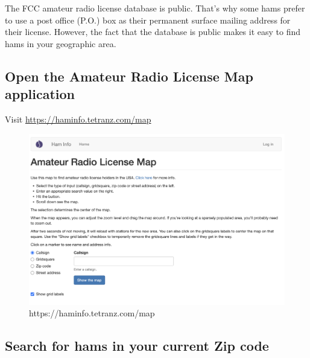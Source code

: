 \documentclass[
  letterpaper,
  DIV=11,
  numbers=noendperiod]{scrreport}
\begin{document}

The FCC amateur radio license database is public. That's why some hams
prefer to use a post office (P.O.) box as their permanent surface
mailing address for their license. However, the fact that the database
is public makes it easy to find hams in your geographic area.

\hypertarget{open-the-amateur-radio-license-map-application}{%
\subsection*{Open the Amateur Radio License Map
application}\label{open-the-amateur-radio-license-map-application}}

Visit \url{https://haminfo.tetranz.com/map}

\begin{figure}

{\centering \includegraphics[width=1\textwidth,height=\textheight]{include/img/ham-radio-license-map.png}

}

\caption{https://haminfo.tetranz.com/map}

\end{figure}

\hypertarget{search-for-hams-in-your-current-zip-code}{%
\subsection*{Search for hams in your current Zip
code}\label{search-for-hams-in-your-current-zip-code}}
\end{document}
